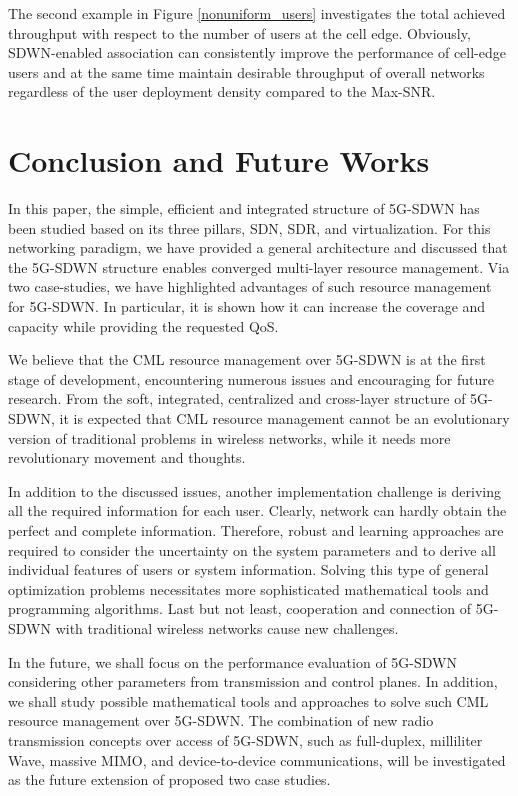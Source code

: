 \documentclass[conference]{IEEEtran}
\begin{document}
The second example in Figure \ref{nonuniform_users} investigates the total achieved throughput with respect to the number of users at the cell edge. Obviously, SDWN-enabled association can consistently improve the performance of cell-edge users and at the same time maintain desirable throughput of overall networks regardless of the user deployment density compared to the Max-SNR.

\section{Conclusion and Future Works}
In this paper, the simple, efficient and integrated structure of 5G-SDWN has been studied based on its three pillars, SDN, SDR, and virtualization. For this networking paradigm, we have provided a general architecture and discussed that the 5G-SDWN structure enables converged multi-layer resource management. Via two case-studies, we have highlighted advantages of such resource management for 5G-SDWN. In particular, it is shown how it can increase the coverage and capacity while providing the requested QoS.

We believe that the CML resource management over 5G-SDWN is at the first stage of development, encountering numerous issues and encouraging for future research. From the soft, integrated, centralized and cross-layer structure of 5G-SDWN, it is expected that CML resource management cannot be an evolutionary version of traditional problems in wireless networks, while it needs more revolutionary movement and thoughts. 

In addition to the discussed issues, another implementation challenge is deriving all the required information for each user. Clearly, network can hardly obtain the perfect and complete information. Therefore, robust and learning approaches are required to consider the uncertainty on the system parameters and to derive all individual features of users or system information. Solving this type of general optimization problems necessitates more sophisticated mathematical tools and programming algorithms. Last but not least, cooperation and connection of 5G-SDWN with traditional wireless networks cause new challenges.
 

In the future, we shall focus on the performance evaluation
of 5G-SDWN considering other parameters from transmission and control planes. In addition, we shall study possible mathematical tools and approaches to solve such CML resource management over 5G-SDWN. The combination of new radio transmission concepts over access of 5G-SDWN, such as full-duplex, milliliter Wave, massive MIMO, and device-to-device communications, will be investigated as the future extension of proposed two case studies.
\end{document}
